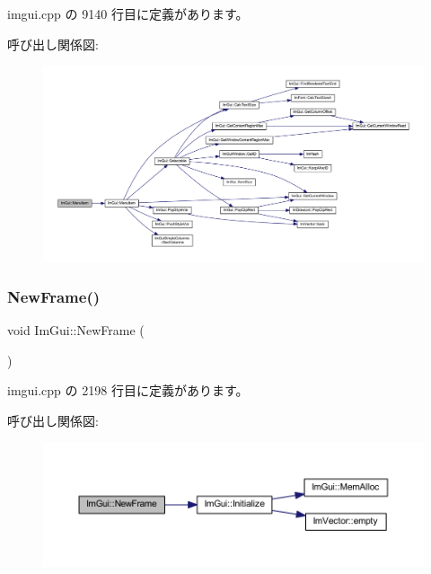  imgui.\+cpp の 9140 行目に定義があります。

呼び出し関係図\+:\nopagebreak
\begin{figure}[H]
\begin{center}
\leavevmode
\includegraphics[width=350pt]{namespace_im_gui_a237e76bff3088f1c2622f4aebae2356e_cgraph}
\end{center}
\end{figure}
\mbox{\label{namespace_im_gui_ab3f1fc018f903b7ad79fd10663375774}} 
\subsubsection{\texorpdfstring{New\+Frame()}{NewFrame()}}
{\footnotesize\ttfamily void Im\+Gui\+::\+New\+Frame (\begin{DoxyParamCaption}{ }\end{DoxyParamCaption})}



 imgui.\+cpp の 2198 行目に定義があります。

呼び出し関係図\+:\nopagebreak
\begin{figure}[H]
\begin{center}
\leavevmode
\includegraphics[width=350pt]{namespace_im_gui_ab3f1fc018f903b7ad79fd10663375774_cgraph}
\end{center}
\end{figure}
\mbox{\label{namespace_im_gui_a77f8b0a33e5335f98661f99e720411da}} 
